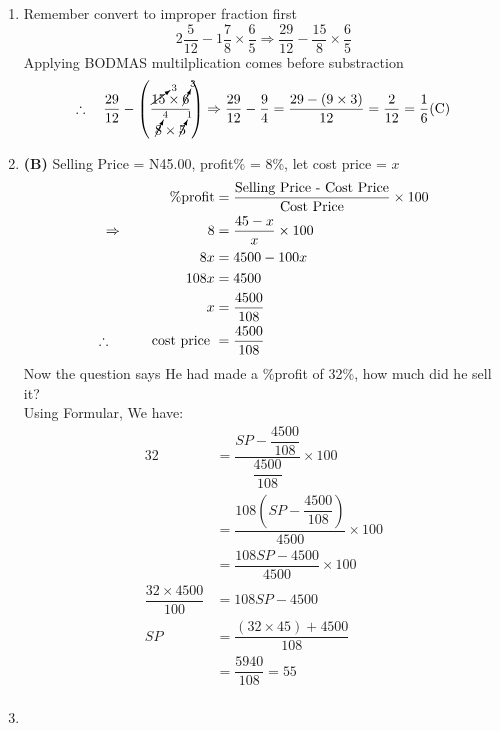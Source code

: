 \begin{multicols}{2}
\begin{enumerate}[label={\textbf{\arabic*.}}]
    \item Remember convert to improper fraction first
    \[2\frac{5}{12} - 1\frac{7}{8} \times \frac{6}{5} \Rightarrow \frac{29}{12} - \frac{15}{8} \times \frac{6}{5}\]
    Applying BODMAS multilplication comes before substraction\\
    \[\therefore \hspace{10px} \dfrac{29}{12} - \left(\dfrac{\cancelto{3}{15} \times \cancelto{3}{6}}{\cancelto{4}{8} \times \cancelto{1}{5}}\right) \Rightarrow \dfrac{29}{12} - \dfrac{9}{4} = \dfrac{29 - (9 \times 3)}{12} = \frac{2}{12} = \frac{1}{6} \text{(C)}\]

    \item \textbf{(B)} Selling Price = N45.00, profit\% = 8\%, let cost price = \(x\)
    \begin{align*}
    \%\text{profit} &= \frac{\text{Selling Price - Cost Price} }{\text{Cost Price}} \times 100 \\
       \Rightarrow \hspace*{60px}  8 &= \frac{45 - x }{x} \times 100 \\
        8x &= 4500 -100x\\
       108x &= 4500 \\ 
       x &= \dfrac{4500}{108}  \\
       \therefore \hspace{25px}  \text{ cost price }  &= \dfrac{4500}{108} \\
    \end{align*}
       Now the question says He had made a \%profit of 32\%, how much did he sell it? \\
       Using Formular, We have: \\
       \begin{align*}
        32 &= \dfrac{SP - \dfrac{4500}{108}}{\dfrac{4500}{108}} \times 100 \\
        &= \dfrac{108\left(SP - \dfrac{4500}{108}\right)}{4500} \times 100 \\
        &=  \dfrac{108SP - 4500}{4500} \times 100 \\
        \dfrac{32 \times 4500}{100} &= 108SP - 4500 \\
        SP &= \dfrac{\left(32 \times 45\right) + 4500}{108} \\ 
        &= \dfrac{5940}{108} = 55 \\
        \end{align*}
    \item 


\end{enumerate}
\end{multicols}
